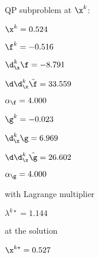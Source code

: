 QP subproblem at $\x^{k}$:

\bigskip
$\x^k=   0.524$


$\f^k =  -0.516$

$\d^k_{\x} \f =  -8.791$

$\d\d^k_{\x} \tilde \f =  33.559$

$\alpha_{\footnotesize\f} =   4.000$

\bigskip
$\g^k =  -0.023$

$\d^k_{\x}\g =   6.969$

$\d\d^k_{\x} \tilde \g =  26.602$

$\alpha_{\footnotesize\g} =   4.000$

\bigskip
with Lagrange multiplier

$\lambda^{k\star} =   1.144$

at the solution

$\x^{k\star} =   0.527$


